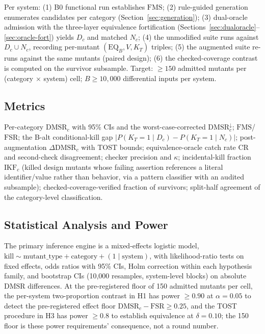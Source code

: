 \documentclass[conference]{IEEEtran}
\newcommand{\dmsr}{\mathrm{DMSR}}
\newcommand{\fsr}{\mathrm{FSR}}
\newcommand{\fms}{\mathrm{FMS}}
\newcommand{\eqb}{\mathrm{EQ}_B}
\begin{document}
Per system: (1) B0 functional run establishes $\fms$; (2) rule-guided generation enumerates candidates per category (Section~\ref{sec:generation}); (3) dual-oracle admission with the three-layer equivalence fortification (Sections~\ref{sec:dualoracle}--\ref{sec:oracle-fort}) yields $D_c$ and matched $N_c$; (4) the unmodified suite runs against $D_c \cup N_c$, recording per-mutant $(\eqb, V, K_T)$ triples; (5) the augmented suite re-runs against the same mutants (paired design); (6) the checked-coverage contrast is computed on the survivor subsample. Target: $\geq 150$ admitted mutants per (category $\times$ system) cell; $B \geq 10{,}000$ differential inputs per system.

\subsection{Metrics}\label{sec:metrics}

Per-category $\dmsr_c$ with 95\% CIs and the worst-case-corrected $\dmsr_c^{\downarrow}$; $\fms$/$\fsr$; the B-alt conditional-kill gap $|P(K_T{=}1 \mid D_c) - P(K_T{=}1 \mid N_c)|$; post-augmentation $\Delta\dmsr_c$ with TOST bounds; equivalence-oracle catch rate $\mathrm{CR}$ and second-check disagreement; checker precision and $\kappa$; incidental-kill fraction $\mathrm{IKF}_c$ (killed design mutants whose failing assertion references a literal identifier/value rather than behavior, via a pattern classifier with an audited subsample); checked-coverage-verified fraction of survivors; split-half agreement of the category-level classification.

\subsection{Statistical Analysis and Power}\label{sec:stats}

The primary inference engine is a mixed-effects logistic model, $\text{kill} \sim \text{mutant\_type} + \text{category} + (1 \mid \text{system})$, with likelihood-ratio tests on fixed effects, odds ratios with 95\% CIs, Holm correction within each hypothesis family, and bootstrap CIs (10{,}000 resamples, system-level blocks) on absolute $\dmsr$ differences. At the pre-registered floor of 150 admitted mutants per cell, the per-system two-proportion contrast in H1 has power $\geq 0.90$ at $\alpha=0.05$ to detect the pre-registered effect floor $\dmsr_c - \fsr \geq 0.25$, and the TOST procedure in H3 has power $\geq 0.8$ to establish equivalence at $\delta = 0.10$; the 150 floor is these power requirements' consequence, not a round number.
\end{document}
